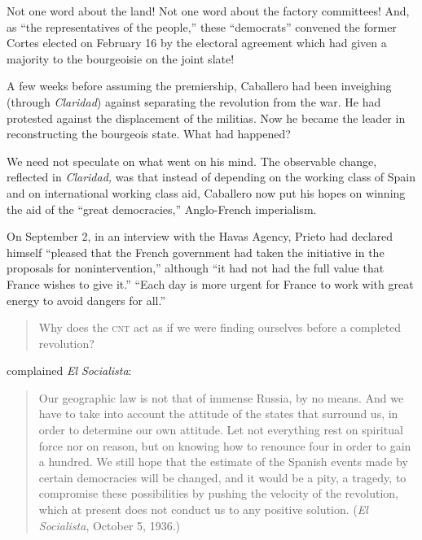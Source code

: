Not one word about the land! Not one word about the factory committees! And, as ``the representatives of the people,'' these ``democrats'' convened the former Cortes elected on February 16 by the electoral agreement which had given a majority to the bourgeoisie on the joint slate!

A few weeks before assuming the premiership, Caballero had been inveighing (through \emph{Claridad}\kp) against separating the revolution from the war. He had protested against the displacement of the militias. Now he became the leader in reconstructing the bourgeois state. What had happened?

We need not speculate on what went on his mind. The observable change, reflected in \emph{Claridad,} was that instead of depending on the working class of Spain and on international working class aid, Caballero now put his hopes on winning the aid of the ``great democracies,'' Anglo-French imperialism.

On September 2, in an interview with the Havas Agency, Prieto had declared himself ``pleased that the French government had taken the initiative in the proposals for nonintervention,'' although ``it had not had the full value that France wishes to give it.''
``Each day is more urgent for France to work with great energy to avoid dangers for all.''

\begin{quotation}
  Why does the \textsc{cnt} act as if we were finding ourselves before a completed revolution?
\end{quotation}
complained \emph{El Socialista}:

\begin{quotation}
  Our geographic law is not that of immense Russia, by no means. And we have to take into account the attitude of the states that surround us, in order to determine our own attitude. Let not everything rest on spiritual force nor on reason, but on knowing how to renounce four in order to gain a hundred. We still hope that the estimate of the Spanish events made by certain democracies will be changed, and it would be a pity, a tragedy, to compromise these possibilities by pushing the velocity of the revolution, which at present does not conduct us to any positive solution. (\emph{El Socialista}, October 5, 1936.)
\end{quotation}

